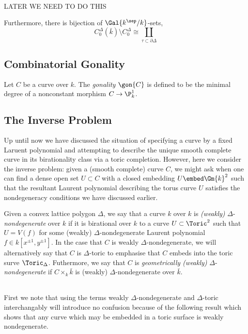 \documentclass[12pt]{article}
\begin{document}
\begin{defn}

\end{defn}

LATER WE NEED TO DO THIS

Furthermore, there is bijection of $\Gal{k^{\sep}/ k}$-sets,
\[ C_0^\Delta(\bar{k}) \setminus C_0^\Delta \cong \coprod_{\tau \subset \partial \Delta}  \]

\subsection{Combinatorial Gonality}

\begin{defn}
Let $C$ be a curve over $k$. The \textit{gonality} $\gon{C}$ is defined to be the minimal degree of a nonconstant morphism $C \to \P^1_k$. 
\end{defn}
 

\subsection{The Inverse Problem}

Up until now we have discussed the situation of specifying a curve by a fixed Laruent polynomial and attempting to describe the unique smooth complete curve in its birationality class via a toric completion. However, here we consider the inverse problem: given a (smooth complete) curve $C$, we might ask when one can find a dense open set $U \subset C$ with a closed embedding $U \embed \Gm{k}^2$ such that the resultant Laurent polynomial describing the torus curve $U$ satisfies the nondegeneracy conditions we have discussed earlier. 

\begin{defn}
Given a convex lattice polygon $\Delta$, we say that a curve $k$ over $k$ is \textit{(weakly)} $\Delta$-\textit{nondegenerate} over $k$ if it is birational over $k$ to a curve $U \subset \Toric^2$ such that $U = V(f)$ for some (weakly) $\Delta$-nondegenerate Laurent polynomial $f \in k[x^{\pm 1}, y^{\pm 1}]$. In the case that $C$ is weakly $\Delta$-nondegenerate, we will alternatively say that $C$ is $\Delta$-toric to emphasise that $C$ embeds into the toric surve $\Toric_\Delta$. Futhermore, we say that $C$ is \textit{geometrically (weakly)} $\Delta$-\textit{nondegenerate} if $C \times_k \bar{k}$ is (weakly) $\Delta$-nondegenerate over $\bar{k}$.  
\end{defn}
\noindent\\
First we note that using the terms weakly $\Delta$-nondegenerate and $\Delta$-toric interchangably will introduce no confusion because of the following result which shows that any curve which may be embedded in a toric surface is weakly nondegenerate.
\end{document}
